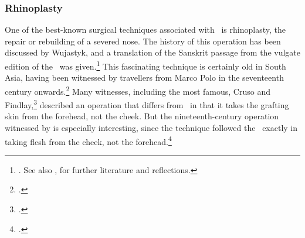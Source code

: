 

\subsubsection{Rhinoplasty}
\label{sec:rhinoplasty}

One of the best-known surgical techniques associated with \SS\ is rhinoplasty, the
repair or rebuilding of a severed nose. The history of this operation has been
discussed by Wujastyk, and a translation of the Sanskrit passage from the vulgate
edition of the \SS\ was given.\footnote{\cite[67--70, 99--100]{wuja-2003}. See
    also \cite[IB, 327--328, note 186]{meul-hist}, for further literature and
    reflections.} This fascinating technique is certainly old in South Asia, having
    been witnessed by travellers from Marco Polo in the seventeenth century
    onwards.\footcite[ii.301]{manu-stor} Many witnesses, including the most famous,
    Cruso and Findlay,\footcite[883, 891\,f.]{cowasjee} described an operation that
    differs from \SS\ in that it takes the grafting skin from the forehead, not the
    cheek.  But the nineteenth-century operation witnessed by \citeauthor{thor-bann}
    is especially interesting, since the technique followed  the \SS\ exactly in
    taking flesh from the cheek, not the forehead.\footcite[352--3]{thor-bann}

